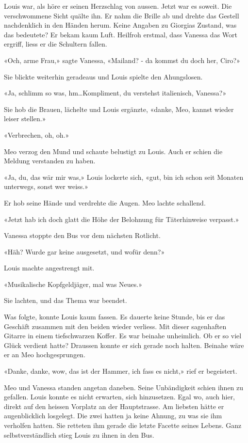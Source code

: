 \sectionbreak

Louis war, als höre er seinen Herzschlag von aussen. 
Jetzt war es soweit. 
Die verschwommene Sicht quälte ihn. Er nahm die Brille ab und drehte das
Gestell nachdenklich in den Händen herum.
Keine Angaben zu Giorgias Zustand, was das bedeutete? Er bekam kaum
Luft.
Heilfroh erstmal, dass Vanessa das Wort ergriff, liess er die Schultern fallen. 

«Och, arme Frau,» sagte Vanessa, «Mailand? - da kommst du doch her, Ciro?»

Sie blickte weiterhin geradeaus und Louis spielte den Ahungslosen.

«Ja, schlimm so was, hm…Kompliment, du verstehst italienisch,
Vanessa?»

Sie hob die Brauen, lächelte und Louis ergänzte, «danke, Meo, kannst wieder leiser stellen.»

«Verbrechen, oh, oh.»

Meo verzog den Mund und schaute belustigt zu Louis. Auch er schien die Meldung
verstanden zu haben.

«Ja, du, das wär mir was,» Louis lockerte sich, «gut, bin ich schon seit
Monaten unterwegs, sonst wer weiss.»

Er hob seine Hände und verdrehte die Augen.
Meo lachte schallend.

«Jetzt hab ich doch glatt die Höhe der Belohnung für Täterhinweise 
verpasst.»

Vanessa stoppte den Bus vor dem nächsten Rotlicht.

«Häh? Wurde gar keine ausgesetzt, und wofür denn?»

Louis machte angestrengt mit.

«Musikalische Kopfgeldjäger, mal was Neues.»

Sie lachten, und das Thema war beendet.

\sectionbreak

Was folgte, konnte Louis kaum fassen.
Es dauerte keine Stunde, bis er das Geschäft zusammen mit den beiden wieder verliess. 
Mit dieser sagenhaften Gitarre in einem
tiefschwarzen Koffer. Es war beinahe unheimlich. Ob er so viel Glück verdient hatte?
Draussen konnte er sich gerade noch halten. Beinahe wäre er an Meo hochgesprungen.

«Danke, danke, wow, das ist der Hammer, ich fass es nicht,» rief er begeistert.

Meo und Vanessa standen angetan daneben. Seine Unbändigkeit schien ihnen zu gefallen.
Louis konnte es nicht erwarten, sich hinzusetzen. Egal wo, auch hier,
direkt auf den heissen Vorplatz an der Hauptstrasse. Am liebsten hätte
er augenblicklich losgelegt. 
Die zwei hatten ja keine Ahnung, zu was sie ihm verholfen hatten. Sie
retteten ihm gerade die letzte Facette seines Lebens.
Ganz selbstverständlich stieg Louis zu ihnen in den Bus.

